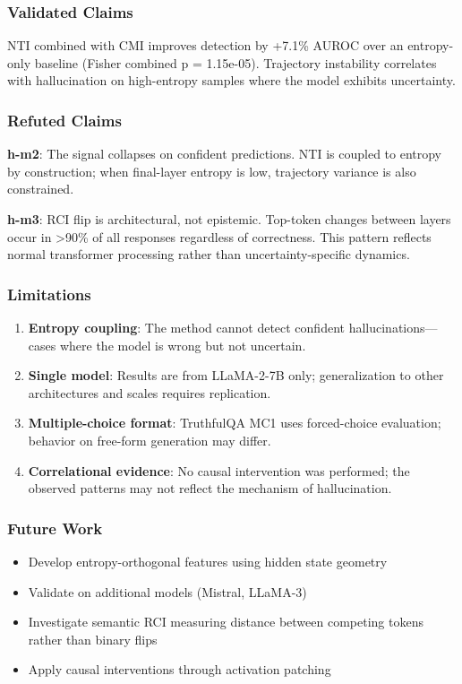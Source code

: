 
\subsubsection{Validated Claims}

NTI combined with CMI improves detection by +7.1\% AUROC over an entropy-only baseline (Fisher combined p = 1.15e-05). Trajectory instability correlates with hallucination on high-entropy samples where the model exhibits uncertainty.

\subsubsection{Refuted Claims}

\textbf{h-m2}: The signal collapses on confident predictions. NTI is coupled to entropy by construction; when final-layer entropy is low, trajectory variance is also constrained.

\textbf{h-m3}: RCI flip is architectural, not epistemic. Top-token changes between layers occur in >90\% of all responses regardless of correctness. This pattern reflects normal transformer processing rather than uncertainty-specific dynamics.

\subsubsection{Limitations}

\begin{enumerate}
\item \textbf{Entropy coupling}: The method cannot detect confident hallucinations---cases where the model is wrong but not uncertain.
\item \textbf{Single model}: Results are from LLaMA-2-7B only; generalization to other architectures and scales requires replication.
\item \textbf{Multiple-choice format}: TruthfulQA MC1 uses forced-choice evaluation; behavior on free-form generation may differ.
\item \textbf{Correlational evidence}: No causal intervention was performed; the observed patterns may not reflect the mechanism of hallucination.
\end{enumerate}

\subsubsection{Future Work}

\begin{itemize}
\item Develop entropy-orthogonal features using hidden state geometry
\item Validate on additional models (Mistral, LLaMA-3)
\item Investigate semantic RCI measuring distance between competing tokens rather than binary flips
\item Apply causal interventions through activation patching
\end{itemize}

